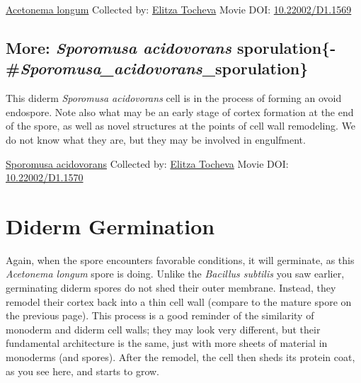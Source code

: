 \documentclass[]{tufte-book}
\begin{document}
\hypertarget{htmlwidget-f27981784839325ab61b}{}

\label{fig:8-10b}\protect\hyperlink{tree}{Acetonema longum} Collected by: \protect\hyperlink{elitza_tocheva}{Elitza Tocheva} Movie DOI: \href{https://doi.org/10.22002/D1.1569}{10.22002/D1.1569}

\hypertarget{more-sporomusa-acidovorans-sporulation-sporomusa_acidovorans_sporulation}{%
\subsection{\texorpdfstring{More: \emph{Sporomusa acidovorans} sporulation\{-\#\emph{Sporomusa\_acidovorans}\_sporulation\}}{More: Sporomusa acidovorans sporulation\{-\#Sporomusa\_acidovorans\_sporulation\}}}\label{more-sporomusa-acidovorans-sporulation-sporomusa_acidovorans_sporulation}}

This diderm \emph{Sporomusa acidovorans} cell is in the process of forming an ovoid endospore. Note also what may be an early stage of cortex formation at the end of the spore, as well as novel structures at the points of cell wall remodeling. We do not know what they are, but they may be involved in engulfment.



\hypertarget{htmlwidget-e7f071652aedf258a748}{}

\label{fig:8-10c}\protect\hyperlink{tree}{Sporomusa acidovorans} Collected by: \protect\hyperlink{elitza_tocheva}{Elitza Tocheva} Movie DOI: \href{https://doi.org/10.22002/D1.1570}{10.22002/D1.1570}

\hypertarget{diderm-germination}{%
\section{Diderm Germination}\label{diderm-germination}}

Again, when the spore encounters favorable conditions, it will germinate, as this \emph{Acetonema longum} spore is doing. Unlike the \emph{Bacillus subtilis} you saw earlier, germinating diderm spores do not shed their outer membrane. Instead, they remodel their cortex back into a thin cell wall (compare to the mature spore on the previous page). This process is a good reminder of the similarity of monoderm and diderm cell walls; they may look very different, but their fundamental architecture is the same, just with more sheets of material in monoderms (and spores). After the remodel, the cell then sheds its protein coat, as you see here, and starts to grow.
\end{document}
